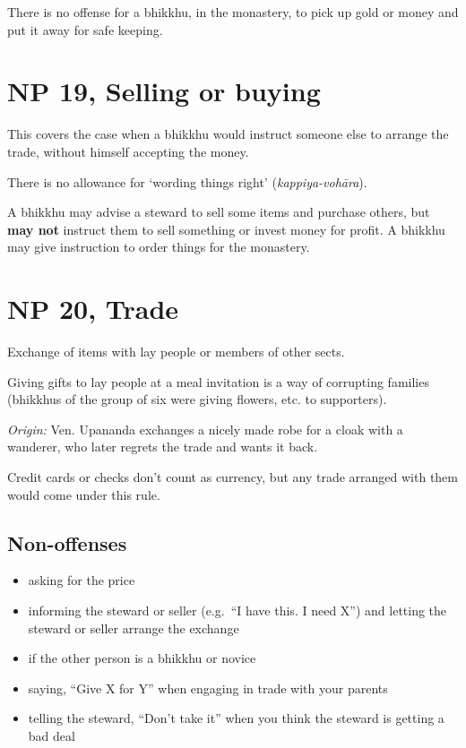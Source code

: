There is no offense for a bhikkhu, in the monastery, to pick up gold or
money and put it away for safe keeping.

\section{NP 19, Selling or buying}

This covers the case when a bhikkhu would instruct someone else to
arrange the trade, without himself accepting the money.

There is no allowance for `wording things right'
(\emph{kappiya-vohāra}).

A bhikkhu may advise a steward to sell some items and purchase others,
but \textbf{may not} instruct them to sell something or invest money for
profit. A bhikkhu may give instruction to order things for the
monastery.

\section{NP 20, Trade}

Exchange of items with lay people or members of other sects.

Giving gifts to lay people at a meal invitation is a way of corrupting
families (bhikkhus of the group of six were giving flowers, etc. to
supporters).

\emph{Origin:} Ven. Upananda exchanges a nicely made robe for a cloak
with a wanderer, who later regrets the trade and wants it back.

Credit cards or checks don't count as currency, but any trade arranged
with them would come under this rule.

\enlargethispage*{\baselineskip}

\subsection{Non-offenses}

\begin{itemize}
\tightlist
\item
  asking for the price
\item
  informing the steward or seller (e.g.~``I have this. I need X'') and
  letting the steward or seller arrange the exchange
\item
  if the other person is a bhikkhu or novice
\item
  saying, ``Give X for Y'' when engaging in trade with your parents
\item
  telling the steward, ``Don't take it'' when you think the steward is
  getting a bad deal
\end{itemize}

